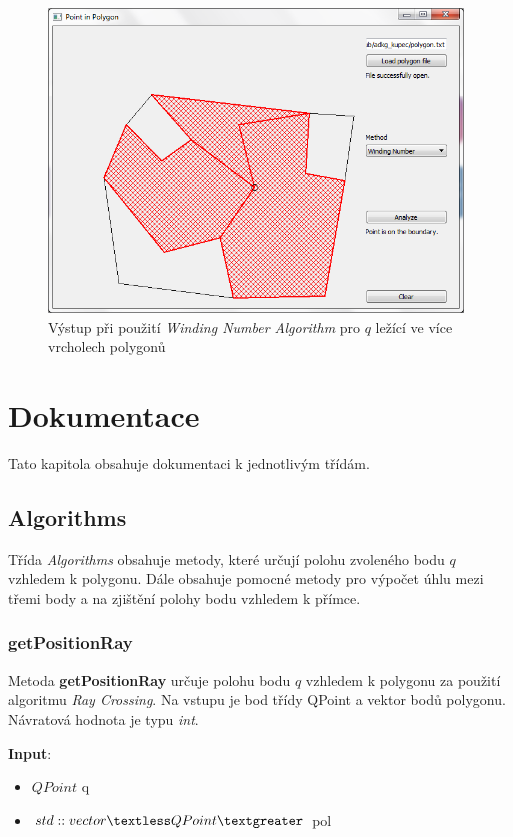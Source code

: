 \documentclass[a4paper, 12pt]{article}
\begin{document}
\begin{figure}[h!]
	\centering
	\includegraphics[width=11cm]{./pictures/gui_winding.png}
	\caption{Výstup při použití \textit{Winding Number Algorithm} pro $q$ ležící ve více vrcholech polygonů}
\end{figure}

\clearpage
 
\section{Dokumentace}
Tato kapitola obsahuje dokumentaci k jednotlivým třídám.

\subsection{Algorithms}
Třída \textsl{Algorithms} obsahuje metody, které určují polohu zvoleného bodu $q$ vzhledem k polygonu. Dále obsahuje pomocné metody pro výpočet úhlu mezi třemi body a na zjištění polohy bodu vzhledem k přímce. 

\subsubsection{getPositionRay}
Metoda \textbf{getPositionRay} určuje polohu bodu $q$ vzhledem k polygonu za použití algoritmu \textsl{Ray Crossing}. Na vstupu je bod třídy QPoint a vektor bodů polygonu. Návratová hodnota je typu \textsl{int}.

\textbf{Input}:
\begin{itemize}
\item $QPoint$ q
\item $std::vector\textless QPoint\textgreater$ pol
\end{itemize}
\end{document}

